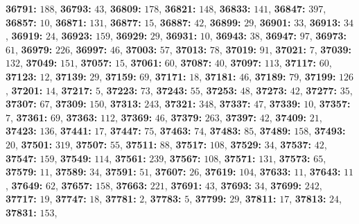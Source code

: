 \textsf{\bfseries 36791:} $188$, \textsf{\bfseries 36793:} $43$, \textsf{\bfseries 36809:} $178$, \textsf{\bfseries 36821:} $148$, \textsf{\bfseries 36833:} $141$, \textsf{\bfseries 36847:} $397$, \textsf{\bfseries 36857:} $10$, \textsf{\bfseries 36871:} $131$, \textsf{\bfseries 36877:} $15$, \textsf{\bfseries 36887:} $42$, \textsf{\bfseries 36899:} $29$, \textsf{\bfseries 36901:} $33$, \textsf{\bfseries 36913:} $34$, \textsf{\bfseries 36919:} $24$, \textsf{\bfseries 36923:} $159$, \textsf{\bfseries 36929:} $29$, \textsf{\bfseries 36931:} $10$, \textsf{\bfseries 36943:} $38$, \textsf{\bfseries 36947:} $97$, \textsf{\bfseries 36973:} $61$, \textsf{\bfseries 36979:} $226$, \textsf{\bfseries 36997:} $46$, \textsf{\bfseries 37003:} $57$, \textsf{\bfseries 37013:} $78$, \textsf{\bfseries 37019:} $91$, \textsf{\bfseries 37021:} $7$, \textsf{\bfseries 37039:} $132$, \textsf{\bfseries 37049:} $151$, \textsf{\bfseries 37057:} $15$, \textsf{\bfseries 37061:} $60$, \textsf{\bfseries 37087:} $40$, \textsf{\bfseries 37097:} $113$, \textsf{\bfseries 37117:} $60$, \textsf{\bfseries 37123:} $12$, \textsf{\bfseries 37139:} $29$, \textsf{\bfseries 37159:} $69$, \textsf{\bfseries 37171:} $18$, \textsf{\bfseries 37181:} $46$, \textsf{\bfseries 37189:} $79$, \textsf{\bfseries 37199:} $126$, \textsf{\bfseries 37201:} $14$, \textsf{\bfseries 37217:} $5$, \textsf{\bfseries 37223:} $73$, \textsf{\bfseries 37243:} $55$, \textsf{\bfseries 37253:} $48$, \textsf{\bfseries 37273:} $42$, \textsf{\bfseries 37277:} $35$, \textsf{\bfseries 37307:} $67$, \textsf{\bfseries 37309:} $150$, \textsf{\bfseries 37313:} $243$, \textsf{\bfseries 37321:} $348$, \textsf{\bfseries 37337:} $47$, \textsf{\bfseries 37339:} $10$, \textsf{\bfseries 37357:} $7$, \textsf{\bfseries 37361:} $69$, \textsf{\bfseries 37363:} $112$, \textsf{\bfseries 37369:} $46$, \textsf{\bfseries 37379:} $263$, \textsf{\bfseries 37397:} $42$, \textsf{\bfseries 37409:} $21$, \textsf{\bfseries 37423:} $136$, \textsf{\bfseries 37441:} $17$, \textsf{\bfseries 37447:} $75$, \textsf{\bfseries 37463:} $74$, \textsf{\bfseries 37483:} $85$, \textsf{\bfseries 37489:} $158$, \textsf{\bfseries 37493:} $20$, \textsf{\bfseries 37501:} $319$, \textsf{\bfseries 37507:} $55$, \textsf{\bfseries 37511:} $88$, \textsf{\bfseries 37517:} $108$, \textsf{\bfseries 37529:} $34$, \textsf{\bfseries 37537:} $42$, \textsf{\bfseries 37547:} $159$, \textsf{\bfseries 37549:} $114$, \textsf{\bfseries 37561:} $239$, \textsf{\bfseries 37567:} $108$, \textsf{\bfseries 37571:} $131$, \textsf{\bfseries 37573:} $65$, \textsf{\bfseries 37579:} $11$, \textsf{\bfseries 37589:} $34$, \textsf{\bfseries 37591:} $51$, \textsf{\bfseries 37607:} $26$, \textsf{\bfseries 37619:} $104$, \textsf{\bfseries 37633:} $11$, \textsf{\bfseries 37643:} $11$, \textsf{\bfseries 37649:} $62$, \textsf{\bfseries 37657:} $158$, \textsf{\bfseries 37663:} $221$, \textsf{\bfseries 37691:} $43$, \textsf{\bfseries 37693:} $34$, \textsf{\bfseries 37699:} $242$, \textsf{\bfseries 37717:} $19$, \textsf{\bfseries 37747:} $18$, \textsf{\bfseries 37781:} $2$, \textsf{\bfseries 37783:} $5$, \textsf{\bfseries 37799:} $29$, \textsf{\bfseries 37811:} $17$, \textsf{\bfseries 37813:} $24$, \textsf{\bfseries 37831:} $153$, 
